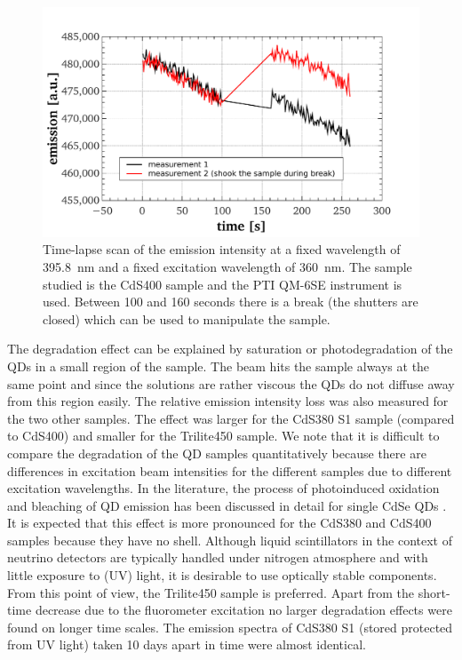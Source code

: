 \documentclass[cits]{JINST}
\begin{document}
\begin{figure}[tbh]
      \begin{center}
        \includegraphics[scale=0.39]{graphs/publication_7_timescan.pdf}
        \caption[]{Time-lapse scan of the emission intensity at a fixed wavelength of 395.8~nm and a fixed excitation wavelength of 360~nm. The sample studied is the CdS400 sample and the PTI QM-6SE instrument is used. Between 100 and 160 seconds there is a break (the shutters are closed) which can be used to manipulate the sample. \label{time_scan}}
        \end{center}
\end{figure}

The degradation effect can be explained by saturation or photodegradation of the QDs in a small region of the sample. The beam hits the sample always at the same point and since the solutions are rather viscous the QDs do not diffuse away from this region easily. The relative emission intensity loss was also measured for the two other samples. The effect was larger for the CdS380 S1 sample (compared to CdS400) and smaller for the Trilite450 sample. We note that it is difficult to compare the degradation of the QD samples quantitatively because there are differences in excitation beam intensities for the different samples due to different excitation wavelengths. In the literature, the process of photoinduced oxidation and bleaching of QD emission has been discussed in detail for single CdSe QDs \cite{vanSark}. It is expected that this effect is more pronounced for the CdS380 and CdS400 samples because they have no shell. Although liquid scintillators in the context of neutrino detectors are typically handled under nitrogen atmosphere and with little exposure to (UV) light, it is desirable to use optically stable components. From this point of view, the Trilite450 sample is preferred. Apart from the short-time decrease due to the fluorometer excitation no larger degradation effects were found on longer time scales. The emission spectra of CdS380 S1 (stored protected from UV light) taken 10 days apart in time were almost identical.
\end{document}
